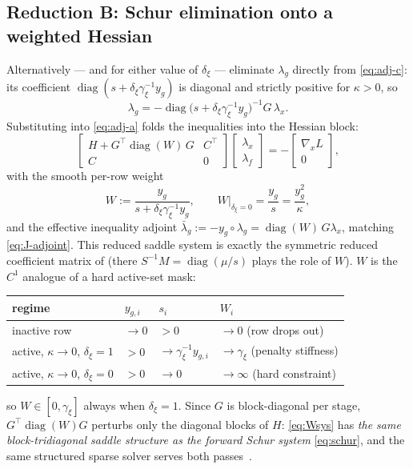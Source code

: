\documentclass[10pt,twocolumn]{article}
\newcommand{\diag}{\operatorname{diag}}
\begin{document}
\subsection{Reduction B: Schur elimination onto a weighted Hessian}
\label{sec:redB}
Alternatively --- and for either value of $\delta_\xi$ --- eliminate $\lambda_g$
directly from \eqref{eq:adj-c}: its coefficient
$\diag(s+\delta_\xi\gamma_\xi^{-1}y_g)$ is diagonal and strictly positive for
$\kappa>0$, so
\begin{equation}
\label{eq:lamg}
\lambda_g = -\diag\!\bigl(s+\delta_\xi\gamma_\xi^{-1}y_g\bigr)^{-1} G\,\lambda_x .
\end{equation}
Substituting into \eqref{eq:adj-a} folds the inequalities into the Hessian block:
\begin{equation}
\label{eq:Wsys}
\begin{bmatrix}
H + G^\top\!\diag(W)\,G & C^\top\\
C & 0
\end{bmatrix}
\begin{bmatrix}\lambda_x\\ \lambda_f\end{bmatrix}
= -\begin{bmatrix}\nabla_x L\\ 0\end{bmatrix},
\end{equation}
with the smooth per-row weight
\begin{equation}
\label{eq:W}
W := \frac{y_g}{s + \delta_\xi\gamma_\xi^{-1}y_g},
\qquad
W\big|_{\delta_\xi=0} = \frac{y_g}{s} = \frac{y_g^2}{\kappa},
\end{equation}
and the effective inequality adjoint
$\bar\lambda_g := -y_g\circ\lambda_g = \diag(W)\,G\lambda_x$, matching
\eqref{eq:J-adjoint}. This reduced saddle system is exactly the symmetric reduced
coefficient matrix of \cite[Eq.~(9)]{frey} (there $S^{-1}M = \diag(\mu/s)$ plays
the role of $W$). $W$ is the $C^1$ analogue of a hard active-set mask:
\begin{center}
\footnotesize
\begin{tabular}{@{}llll@{}}
\toprule
regime & $y_{g,i}$ & $s_i$ & $W_i$\\
\midrule
inactive row & $\to 0$ & $>0$ & $\to 0$ (row drops out)\\
active, $\kappa{\to}0$, $\delta_\xi{=}1$ & $>0$ & $\to\gamma_\xi^{-1}y_{g,i}$ & $\to\gamma_\xi$ (penalty stiffness)\\
active, $\kappa{\to}0$, $\delta_\xi{=}0$ & $>0$ & $\to 0$ & $\to\infty$ (hard constraint)\\
\bottomrule
\end{tabular}
\end{center}
so $W\in[0,\gamma_\xi]$ always when $\delta_\xi = 1$. Since $G$ is block-diagonal
per stage, $G^\top\diag(W)G$ perturbs only the diagonal blocks of $H$:
\eqref{eq:Wsys} has \emph{the same block-tridiagonal saddle structure as the forward
Schur system} \eqref{eq:schur}, and the same structured sparse solver serves both
passes~\cite{turbompc}.
\end{document}
